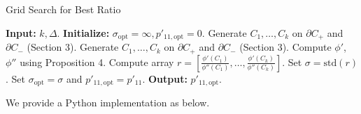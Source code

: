 \documentclass[
  letterpaper,
  numbers=noenddot,
  DIV=11]{scrreprt}
\theoremstyle{definition}
\theoremstyle{plain}
\theoremstyle{plain}
\theoremstyle{remark}
\begin{document}
\begin{algorithm}[H]
    \caption{Grid Search for Best Ratio}
    \label{alg-lfpm}
\begin{algorithmic}[1]
        \State \textbf{Input:} $k, \Delta$.
        \State \textbf{Initialize:} $\sigma_{\text{opt}} = \infty, p'_{11,\text{opt}} = 0$.
        \State Generate $C_1, \dots, C_k$ on $\partial C_+$ and $\partial C_-$ (Section 3).
        \State Generate $C_1, \dots, C_k$ on $\partial C_+$ and $\partial C_-$ (Section 3).
            \State Compute $\phi'$, $\phi''$ using Proposition 4. 
            \State Compute array $r = \left[ \frac{\phi'(C_1)}{\phi''(C_1)}, \dots, \frac{\phi'(C_k)}{\phi''(C_k)} \right]$.
            \State Set $\sigma = \text{std}(r)$.
                \State Set $\sigma_{\text{opt}} = \sigma$ and $p'_{11,\text{opt}} = p'_{11}$.
            \EndIf
        \EndFor
        \State \textbf{Output:} $p'_{11,\text{opt}}$.
    \end{algorithmic}
\end{algorithm}

We provide a Python implementation as below.
\end{document}
